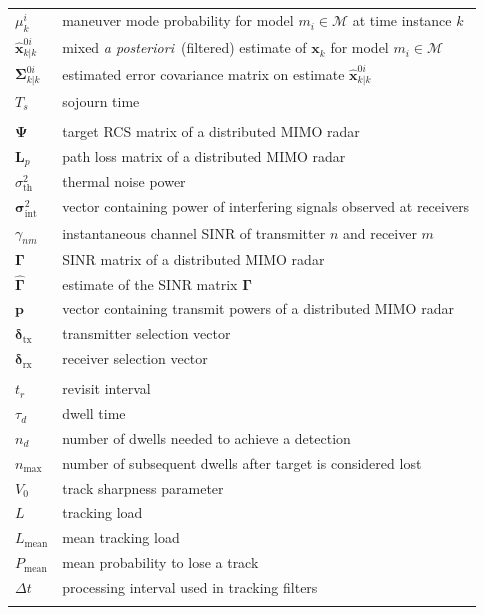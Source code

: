 \documentclass[english, 12pt, a4paper, elec, utf8, a-1b, online]{aaltothesis}
\renewcommand{\vec}[1]{\mathbf{#1}}
\newcommand{\x}{\vec{x}_k}
\newcommand{\modeprob}{\mu_k^i}
\newcommand{\xmxinitcurr}{\hat{\vec{x}}^{0i}_{k|k}}
\newcommand{\ecovmxinitcurr}{\bm{\Sigma}^{0i}_{k|k}}
\def\post{\textit{a posteriori}\ }
\newcommand{\mimm}{\mathcal{M}}
\newcommand{\dt}{\Delta t}
\newcommand{\thnoise}{\sigma^2_{\text{th}}}
\newcommand{\vpower}{\boldsymbol{p}}
\newcommand{\vintnoise}{\boldsymbol{\sigma}^2_{\text{int}}}
\newcommand{\esinr}{\gamma_{{nm}}}
\newcommand{\vsinrexp}{\boldsymbol{\Gamma}}
\newcommand{\vsinrb}{\widehat{\boldsymbol{\Gamma}}}
\newcommand{\vpl}{\vec{L}_p}
\newcommand{\vrcs}{\boldsymbol{\Psi}}
\newcommand{\vasvtx}{\boldsymbol{\delta}_{\text{tx}}}
\newcommand{\vasvrx}{\boldsymbol{\delta}_{\text{rx}}}
\newcommand{\ri}{t_r}
\begin{document}
\begin{longtable}{ll}
$\modeprob$ & maneuver mode probability for model $m_i \in \mimm$ at time instance $k$ \\
$\xmxinitcurr$ & mixed \post (filtered) estimate of $\x$ for model $m_i \in \mimm$\\
$\ecovmxinitcurr$ & estimated error covariance matrix on estimate $\xmxinitcurr$\\
$T_s$ & sojourn time \\
&\\
$\vrcs$ & target RCS matrix of a distributed MIMO radar \\
$\vpl$ & path loss matrix of a distributed MIMO radar\\
$\thnoise$ & thermal noise power \\
$\vintnoise$ & vector containing power of interfering signals observed at receivers \\
$\esinr$ & instantaneous channel SINR of transmitter $n$ and receiver $m$ \\
$\vsinrexp$ & SINR matrix of a distributed MIMO radar \\
$\vsinrb$ & estimate of the SINR matrix $\vsinrexp$ \\
$\vpower$ & vector containing transmit powers of a distributed MIMO radar \\
$\vasvtx$ & transmitter selection vector \\
$\vasvrx$ & receiver selection vector \\
&\\
$\ri$ & revisit interval \\
$\tau_d$ & dwell time \\
$n_d$ & number of dwells needed to achieve a detection \\
$n_\text{max}$ & number of subsequent dwells after target is considered lost \\
$V_0$ & track sharpness parameter \\
$L$ & tracking load \\
$L_\text{mean}$ & mean tracking load \\
$P_\text{mean}$ & mean probability to lose a track \\
$\dt$ & processing interval used in tracking filters \\
&\\

\end{longtable}
\end{document}
